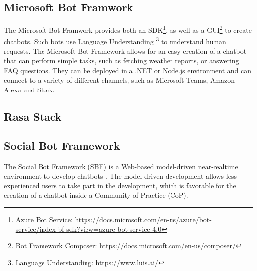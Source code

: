 \subsection{Microsoft Bot Framwork}
The Microsoft Bot Framwork provides both an SDK\footnote{Azure Bot Service: \href{https://docs.microsoft.com/en-us/azure/bot-service/index-bf-sdk?view=azure-bot-service-4.0}{https://docs.microsoft.com/en-us/azure/bot-service/index-bf-sdk?view=azure-bot-service-4.0}}, as well as a GUI\footnote{Bot Framework Composer: \href{https://docs.microsoft.com/en-us/composer/}{https://docs.microsoft.com/en-us/composer/}} to create chatbots. Such bots use Language Understanding \footnote{Language Understanding: \href{https://www.luis.ai/}{https://www.luis.ai/}} to understand human requests. The Microsoft Bot Framework allows for an easy creation of a chatbot that can perform simple tasks, such as fetching weather reports, or answering FAQ questions. They can be deployed in a .NET or Node.js environment and can connect to a variety of different channels, such as Microsoft Teams, Amazon Alexa and Slack.

\subsection{Rasa Stack}

\subsection{Social Bot Framework}

The Social Bot Framework (SBF) is a Web-based model-driven near-realtime environment to develop chatbots \cite{NLKl19}. The model-driven development allows less experienced users to take part in the development, which is favorable for the creation of a chatbot inside a Community of Practice (CoP).
